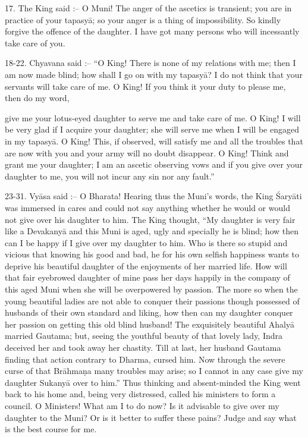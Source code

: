 17. The King said :-- O Muni! The anger of the ascetics is transient; you are in practice of your tapasy\=a; so your anger is a thing of impossibility. So kindly forgive the offence of the daughter. I have got many persons who will incessantly take care of you.

18-22. Chyavana said :-- ``O King! There is none of my relations with me; then I am now made blind; how shall I go on with my tapasy\=a? I do not think that your servants will take care of me. O King! If you think it your duty to please me, then do my word,

give me your lotus-eyed daughter to serve me and take care of me. O King! I will be very glad if I acquire your daughter; she will serve me when I will be engaged in my tapasy\=a. O King! This, if observed, will satisfy me and all the troubles that are now with you and your army will no doubt disappear. O King! Think and grant me your daughter; I am an ascetic observing vows and if you give over your daughter to me, you will not incur any sin nor any fault.''

23-31. Vy\=asa said :-- O Bharata! Hearing thus the Muni's words, the King \'Sary\=ati was immersed in cares and could not say anything whether he would or would not give over his daughter to him. The King thought, ``My daughter is very fair like a Devakany\=a and this Muni is aged, ugly and specially he is blind; how then can I be happy if I give over my daughter to him. Who is there so stupid and vicious that knowing his good and bad, he for his own selfish happiness wants to deprive his beautiful daughter of the enjoyments of her married life. How will that fair eyebrowed daughter of mine pass her days happily in the company of this aged Muni when she will be overpowered by passion. The more so when the young beautiful ladies are not able to conquer their passions though possessed of husbands of their own standard and liking, how then can my daughter conquer her passion on getting this old blind husband! The exquisitely beautiful Ahaly\=a married Gautama; but, seeing the youthful beauty of that lovely lady, Indra deceived her and took away her chastity. Till at last, her husband Gautama finding that action contrary to Dharma, cursed him. Now through the severe curse of that Br\=ahma\d{n}a many troubles may arise; so I cannot in any case give my daughter Sukany\=a over to him.'' Thus thinking and absent-minded the King went back to his home and, being very distressed, called his ministers to form a council. O Ministers! What am I to do now? Is it advisable to give over my daughter to the Muni? Or is it better to suffer these pains? Judge and say what is the best course for me.


